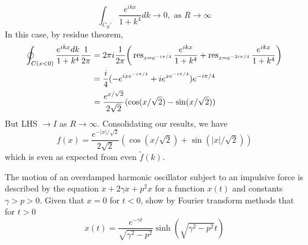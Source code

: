 \documentclass[a4paper]{article}
\begin{document}
\begin{ans}
$$\int_{C_R'}\frac{e^{ikx}}{1+k^4}dk\rightarrow0, \text{ as }R\rightarrow\infty$$
In this case, by residue theorem,
\begin{align}
\oint_{C(x<0)}\frac{e^{ikx}dk}{1+k^4}\frac{1}{2\pi}&=2\pi i\frac{1}{2\pi}\bigg(\operatorname{res}_{z=e^{-i\pi/4}}\frac{e^{ikx}}{1+k^4}+\operatorname{res}_{z=e^{-3i\pi/4}}\frac{e^{ikx}}{1+k^4}\bigg)\nonumber\\&=\frac{i}{4}(-e^{ixe^{-i\pi/4}}+ie^{xe^{-i\pi/4}})e^{-i\pi/4}\nonumber\\&=\frac{e^{x/\sqrt{2}}}{2\sqrt{2}}(\cos(x/\sqrt{2})-\sin(x/\sqrt{2}))\nonumber
\end{align}
But LHS $\rightarrow I$ as $R\rightarrow\infty$. Consolidating our results, we have
$$f(x)=\frac{e^{-|x|/\sqrt{2}}}{2\sqrt{2}}(\cos(x/\sqrt{2})+\sin(|x|/\sqrt{2}))$$
which is even as expected from even $\tilde{f}(k)$.
\begin{center}
\end{center}
\begin{center}
\end{center}
\end{ans}
\newpage
\begin{qns}
The motion of an overdamped harmonic oscillator subject to an impulsive force is described by the equation $\ddot{x}+2\gamma\dot{x}+p^2x$ for a function $x(t)$ and constants $\gamma>p>0$. Given that $x = 0$ for $t < 0$, show by Fourier transform methods that for $t > 0$
$$x(t)=\frac{e^{-\gamma t}}{\sqrt{\gamma^2-p^2}}\sinh(\sqrt{\gamma^2-p^2}t)$$
\end{qns}
\end{document}
